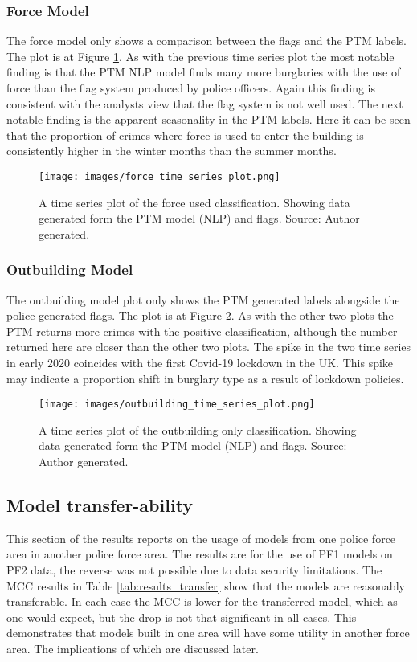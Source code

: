 \subsubsection{Force Model}The force model only shows a comparison between the flags and the PTM labels. The plot is at Figure \ref{fig:force_ts}. As with the previous time series plot the most notable finding is that the PTM NLP model finds many more burglaries with the use of force than the flag system produced by police officers. Again this finding is consistent with the analysts view that the flag system is not well used. The next notable finding is the apparent seasonality in the PTM labels. Here it can be seen that the proportion of crimes where force is used to enter the building is consistently higher in the winter months than the summer months.   


\begin{figure}
  \texttt{[image: images/force\_time\_series\_plot.png]}
  \caption[Force used model time series plot]{A time series plot of the force used classification. Showing data generated form the PTM model (NLP) and flags. Source: Author generated.}
  \label{fig:force_ts}
\end{figure}


\subsubsection{Outbuilding Model} The outbuilding model plot only shows the PTM generated labels alongside the police generated flags. The plot is at Figure \ref{fig:outbuild_ts}. As with the other two plots the PTM returns more crimes with the positive classification, although the number returned here are closer than the other two plots. The spike in the two time series in early 2020 coincides with the first Covid-19 lockdown in the UK. This spike may indicate a proportion shift in burglary type as a result of lockdown policies.


\begin{figure}
  \texttt{[image: images/outbuilding\_time\_series\_plot.png]}
  \caption[Outbuilding only model time series plot]{A time series plot of the outbuilding only classification. Showing data generated form the PTM model (NLP) and flags. Source: Author generated.}
  \label{fig:outbuild_ts}
\end{figure}

\subsection{Model transfer-ability} This section of the results reports on the usage of models from one police force area in another police force area. The results are for  the use of PF1 models on PF2 data, the reverse was not possible due to data security limitations. The MCC results in Table \ref{tab:results_transfer} show that the models are reasonably transferable. In each case the MCC is lower for the transferred model, which as one would expect, but the drop is not that significant in all cases. This demonstrates that models built in one area will have some utility in another force area. The implications of which are discussed later.  


